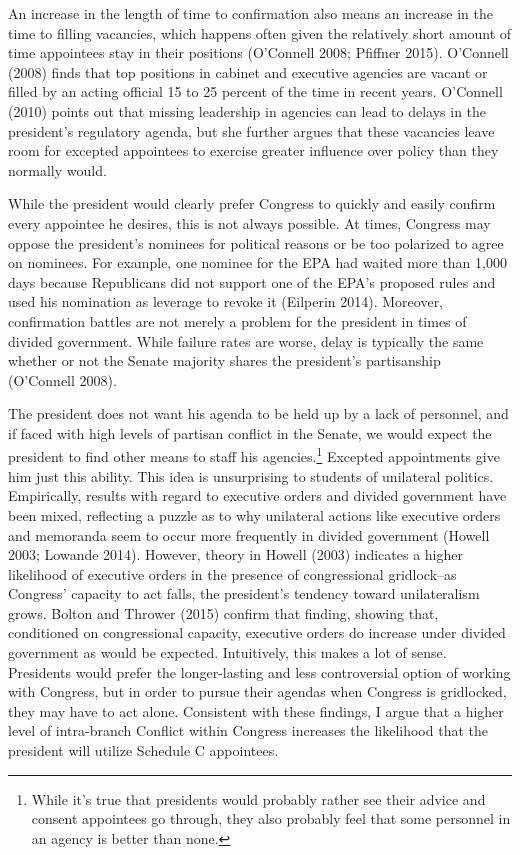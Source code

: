 \documentclass[12pt]{article}
\begin{document}
An increase in the length of time to confirmation also means an increase in the time to filling vacancies, which happens often given the relatively short amount of time appointees stay in their positions (O'Connell 2008; Pfiffner 2015). O'Connell (2008) finds that top positions in cabinet and executive agencies are vacant or filled by an acting official 15 to 25 percent of the time in recent years. O'Connell (2010) points out that missing leadership in agencies can lead to delays in the president's regulatory agenda, but she further argues that these vacancies leave room for excepted appointees to exercise greater influence over policy than they normally would.

While the president would clearly prefer Congress to quickly and easily confirm every appointee he desires, this is not always possible. At times, Congress may oppose the president's nominees for political reasons or be too polarized to agree on nominees. For example, one nominee for the EPA had waited more than 1,000 days because Republicans did not support one of the EPA's proposed rules and used his nomination as leverage to revoke it (Eilperin 2014). Moreover, confirmation battles are not merely a problem for the president in times of divided government. While failure rates are worse, delay is typically the same whether or not the Senate majority shares the president's partisanship (O'Connell 2008).  

The president does not want his agenda to be held up by a lack of personnel, and if faced with high levels of partisan conflict in the Senate, we would expect the president to find other means to staff his agencies.\footnote{While it's true that presidents would probably rather see their advice and consent appointees go through, they also probably feel that some personnel in an agency is better than none.} Excepted appointments give him just this ability. This idea is unsurprising to students of unilateral politics. Empirically, results with regard to executive orders and divided government have been mixed, reflecting a puzzle as to why unilateral actions like executive orders and memoranda seem to occur more frequently in divided government (Howell 2003; Lowande 2014). However, theory in Howell (2003) indicates a higher likelihood of executive orders in the presence of congressional gridlock--as Congress' capacity to act falls, the president's tendency toward unilateralism grows. Bolton and Thrower (2015) confirm that finding, showing that, conditioned on congressional capacity, executive orders do increase under divided government as would be expected. Intuitively, this makes a lot of sense. Presidents would prefer the longer-lasting and less controversial option of working with Congress, but in order to pursue their agendas when Congress is gridlocked, they may have to act alone. Consistent with these findings, I argue that a higher level of intra-branch Conflict within Congress increases the likelihood that the president will utilize Schedule C appointees.  
\end{document}
